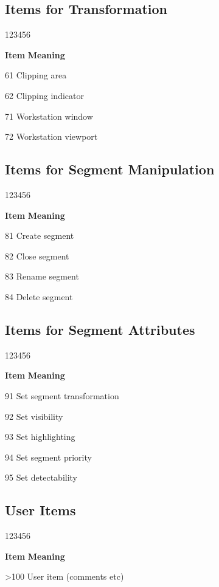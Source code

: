 \subsection*{Items for Transformation}

\begin{DLtt}{123456}
\item[{\rm\bf Item}] {\bf Meaning}
\item[61]Clipping area
\item[62]Clipping indicator
\item[71]Workstation window
\item[72]Workstation viewport
\end{DLtt}

\subsection*{Items for Segment Manipulation}

\begin{DLtt}{123456}
\item[{\rm\bf Item}] {\bf Meaning}
\item[81]Create segment
\item[82]Close segment
\item[83]Rename segment
\item[84]Delete segment
\end{DLtt}

\subsection*{Items for Segment Attributes}

\begin{DLtt}{123456}
\item[{\rm\bf Item}] {\bf Meaning}
\item[91]Set segment transformation
\item[92]Set visibility
\item[93]Set highlighting
\item[94]Set segment priority
\item[95]Set detectability
\end{DLtt}

\subsection*{User Items}

\begin{DLtt}{123456}
\item[{\rm\bf Item}] {\bf Meaning}
\item[>100]User item (comments etc)
\end{DLtt}


